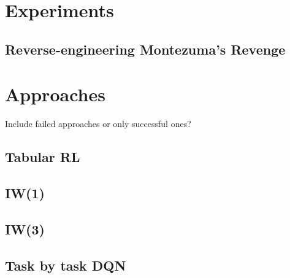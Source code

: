 \chapter{Experiments}
\section{Reverse-engineering Montezuma's Revenge}

\chapter{Approaches}
Include failed approaches or only successful ones?

\section{Tabular RL}
\section{IW(1)}
\section{IW(3)}
\section{Task by task DQN}


